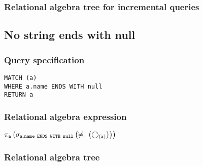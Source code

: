 \subsubsection*{Relational algebra tree for incremental queries}


\subsection{No string ends with null}

\subsubsection*{Query specification}

\begin{lstlisting}
MATCH (a)
WHERE a.name ENDS WITH null
RETURN a
\end{lstlisting}

\subsubsection*{Relational algebra expression}

$\projection{\var{a}} \left(\selection{\mathtt{a.name~ENDS~WITH~null}} \left(\alldifferent{} \left(\getvertices{a}{}\right)\right)\right)$

\subsubsection*{Relational algebra tree}


